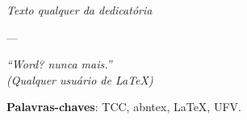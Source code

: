 \documentclass[
	12pt,				    %
	openright,			    %
	oneside,			    %
	a4paper,			    %
    sumario=tradicional,    %
	english,			    %
	brazil,				    %
	]{abntex2}              %
\begin{document}
\frenchspacing

\pretextual

\imprimircapa

\imprimirfolhaderosto

\imprimirfolhadeaprovacao

\begin{dedicatoria}
   \vspace*{\fill}
   \centering
   \noindent
   \textit{Texto qualquer da dedicatória}
   \vspace*{\fill}
\end{dedicatoria}

\begin{agradecimentos}

\end{agradecimentos}
 ---

\begin{epigrafe}
    \vspace*{\fill}
	\begin{flushright}
		\textit{``Word? nunca mais.''\\
		(Qualquer usuário de \LaTeX)}
	\end{flushright}
\end{epigrafe}


\begin{resumo}
 \noindent

 \vspace{\onelineskip}

 \noindent
 \textbf{Palavras-chaves}: TCC, abntex, LaTeX, UFV.
\end{resumo}

%
%

\listoffigures*
\cleardoublepage
\end{document}
